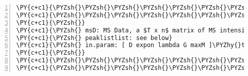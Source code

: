 \begin{Verbatim}[commandchars=\\\{\},codes={\catcode`\$=3\catcode`\^=7\catcode`\_=8},gobble=0,numbers=left,fontfamily=fvm,fontshape=n,fontsize=\footnotesize,tabsize=2]
\PY{c+c1}{\PYZsh{}\PYZsh{}\PYZsh{}\PYZsh{}\PYZsh{}\PYZsh{}\PYZsh{}\PYZsh{}\PYZsh{}\PYZsh{}\PYZsh{}\PYZsh{}\PYZsh{}\PYZsh{}\PYZsh{}\PYZsh{}\PYZsh{}\PYZsh{}\PYZsh{}\PYZsh{}\PYZsh{}\PYZsh{}\PYZsh{}\PYZsh{}\PYZsh{}\PYZsh{}\PYZsh{}\PYZsh{}\PYZsh{}\PYZsh{}\PYZsh{}\PYZsh{}\PYZsh{}\PYZsh{}\PYZsh{}\PYZsh{}\PYZsh{}\PYZsh{}\PYZsh{} Input \PYZsh{}\PYZsh{}\PYZsh{}\PYZsh{}\PYZsh{}\PYZsh{}\PYZsh{}\PYZsh{}\PYZsh{}\PYZsh{}\PYZsh{}\PYZsh{}\PYZsh{}\PYZsh{}\PYZsh{}\PYZsh{}\PYZsh{}\PYZsh{}\PYZsh{}\PYZsh{}\PYZsh{}\PYZsh{}\PYZsh{}\PYZsh{}\PYZsh{}\PYZsh{}\PYZsh{}\PYZsh{}\PYZsh{}\PYZsh{}\PYZsh{}\PYZsh{}\PYZsh{}}
\PY{c+c1}{\PYZsh{}\PYZsh{}\PYZsh{}\PYZsh{}\PYZsh{}\PYZsh{}\PYZsh{}\PYZsh{}\PYZsh{}\PYZsh{}\PYZsh{}\PYZsh{}\PYZsh{}\PYZsh{}\PYZsh{}\PYZsh{}\PYZsh{}\PYZsh{}\PYZsh{}\PYZsh{}\PYZsh{}\PYZsh{}\PYZsh{}\PYZsh{}\PYZsh{}\PYZsh{}\PYZsh{}\PYZsh{}\PYZsh{}\PYZsh{}\PYZsh{}\PYZsh{}\PYZsh{}\PYZsh{}\PYZsh{}\PYZsh{}\PYZsh{}\PYZsh{}\PYZsh{}\PYZsh{}\PYZsh{}\PYZsh{}\PYZsh{}\PYZsh{}\PYZsh{}\PYZsh{}\PYZsh{}\PYZsh{}\PYZsh{}\PYZsh{}\PYZsh{}\PYZsh{}\PYZsh{}\PYZsh{}\PYZsh{}\PYZsh{}\PYZsh{}\PYZsh{}\PYZsh{}\PYZsh{}\PYZsh{}\PYZsh{}\PYZsh{}\PYZsh{}\PYZsh{}\PYZsh{}\PYZsh{}\PYZsh{}\PYZsh{}\PYZsh{}\PYZsh{}\PYZsh{}\PYZsh{}\PYZsh{}\PYZsh{}\PYZsh{}\PYZsh{}\PYZsh{}\PYZsh{}}
\PY{c+c1}{\PYZsh{}}
\PY{c+c1}{\PYZsh{} msD: MS Data, a $T x n$ matrix of MS intensities. One column per spectra.}
\PY{c+c1}{\PYZsh{} peaklistlist: see below}
\PY{c+c1}{\PYZsh{} in.param: [ D expon lambda G maxM ]\PYZhy{}tuple as a vector}
\PY{c+c1}{\PYZsh{}}
\PY{c+c1}{\PYZsh{}\PYZsh{}\PYZsh{}\PYZsh{}\PYZsh{}\PYZsh{}\PYZsh{}\PYZsh{}\PYZsh{}\PYZsh{}\PYZsh{}\PYZsh{}\PYZsh{}\PYZsh{}\PYZsh{}\PYZsh{}\PYZsh{}\PYZsh{}\PYZsh{}\PYZsh{}\PYZsh{}\PYZsh{}\PYZsh{}\PYZsh{}\PYZsh{}\PYZsh{}\PYZsh{}\PYZsh{}\PYZsh{}\PYZsh{}\PYZsh{}\PYZsh{}\PYZsh{}\PYZsh{}\PYZsh{}\PYZsh{}\PYZsh{}\PYZsh{}\PYZsh{}\PYZsh{}\PYZsh{}\PYZsh{}\PYZsh{}\PYZsh{}\PYZsh{}\PYZsh{}\PYZsh{}\PYZsh{}\PYZsh{}\PYZsh{}\PYZsh{}\PYZsh{}\PYZsh{}\PYZsh{}\PYZsh{}\PYZsh{}\PYZsh{}\PYZsh{}\PYZsh{}\PYZsh{}\PYZsh{}\PYZsh{}\PYZsh{}\PYZsh{}\PYZsh{}\PYZsh{}\PYZsh{}\PYZsh{}\PYZsh{}\PYZsh{}\PYZsh{}\PYZsh{}\PYZsh{}\PYZsh{}\PYZsh{}\PYZsh{}\PYZsh{}\PYZsh{}\PYZsh{}}
\PY{c+c1}{\PYZsh{}\PYZsh{}\PYZsh{}\PYZsh{}\PYZsh{}\PYZsh{}\PYZsh{}\PYZsh{}\PYZsh{}\PYZsh{}\PYZsh{}\PYZsh{}\PYZsh{}\PYZsh{}\PYZsh{}\PYZsh{}\PYZsh{}\PYZsh{}\PYZsh{}\PYZsh{}\PYZsh{}\PYZsh{}\PYZsh{}\PYZsh{}\PYZsh{}\PYZsh{}\PYZsh{}\PYZsh{}\PYZsh{}\PYZsh{}\PYZsh{}\PYZsh{}\PYZsh{}\PYZsh{}\PYZsh{}\PYZsh{}\PYZsh{}\PYZsh{} Output \PYZsh{}\PYZsh{}\PYZsh{}\PYZsh{}\PYZsh{}\PYZsh{}\PYZsh{}\PYZsh{}\PYZsh{}\PYZsh{}\PYZsh{}\PYZsh{}\PYZsh{}\PYZsh{}\PYZsh{}\PYZsh{}\PYZsh{}\PYZsh{}\PYZsh{}\PYZsh{}\PYZsh{}\PYZsh{}\PYZsh{}\PYZsh{}\PYZsh{}\PYZsh{}\PYZsh{}\PYZsh{}\PYZsh{}\PYZsh{}\PYZsh{}\PYZsh{}\PYZsh{}}

\end{Verbatim}

